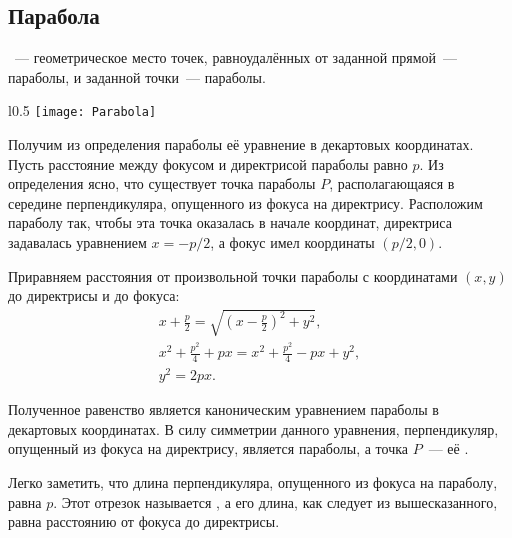 \subsection{Парабола}
~--- геометрическое место точек, равноудалённых от заданной прямой~---  параболы, и заданной точки~---  параболы.

\begin{wrapfigure}[11]{l}{0.5\tw}
	\centering
	\vspace{-.7pc}
	\texttt{[image: Parabola]}
\end{wrapfigure}
Получим из определения параболы её уравнение в декартовых координатах. Пусть расстояние между фокусом и директрисой параболы равно $p$. Из определения ясно, что существует точка параболы $P$, располагающаяся в середине перпендикуляра, опущенного из фокуса на директрису. Расположим параболу так, чтобы эта точка оказалась в начале координат, директриса задавалась уравнением $x = -p/2$, а фокус имел координаты $(p/2, 0)$.

Приравняем расстояния от произвольной точки параболы с координатами $(x, y)$ до директрисы и до фокуса:
\begin{gather*}
	x + \frac{p}{2} = \sqrt{\left(x - \frac{p}{2} \right)^2 + y^2},\\
	x^2 + \frac{p^2}{4} + px = x^2 + \frac{p^2}{4} - px + y^2,\\
	y^2 = 2px. \tag{\theequation}
\end{gather*}

Полученное равенство является каноническим уравнением параболы в декартовых координатах. В силу симметрии данного уравнения, перпендикуляр, опущенный из фокуса на директрису, является  параболы, а точка $P$~--- её .

Легко заметить, что длина перпендикуляра, опущенного из фокуса на параболу, равна $p$. Этот отрезок называется , а его длина, как следует из вышесказанного, равна расстоянию от фокуса до директрисы.

